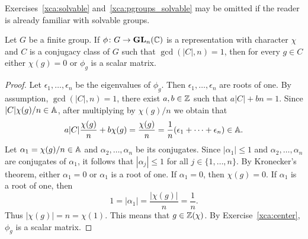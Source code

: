 Exercises~\ref{xca:solvable} and~\ref{xca:pgroups_solvable} may be omitted if the reader is already familiar with solvable groups.

\begin{theorem}[Burnside]
	\label{thm:Burnside_auxiliar}
	Let $G$ be a finite group. If $\phi\colon G\to\mathbf{GL}_n(\mathbb{C})$ is a representation
	with character $\chi$ and $C$ is a conjugacy class of $G$ such that 
	$\gcd(|C|,n)=1$, then for every $g\in C$ either 
	$\chi(g)=0$ or $\phi_g$ is a scalar matrix. 
\end{theorem}





 \begin{proof}
	Let $\epsilon_1,\dots,\epsilon_n$ be the eigenvalues of $\phi_g$. Then 
    $\epsilon_1,\dots,\epsilon_n$ are roots of one. 
    By assumption, 
	$\gcd(|C|,n)=1$, there exist $a,b\in\mathbb{Z}$ such that $a|C|+bn=1$. Since 
	$|C|\chi(g)/n\in\mathbb{A}$, after multiplying by $\chi(g)/n$ we obtain that  
	\[
		a|C|\frac{\chi(g)}{n}+b\chi(g)=\frac{\chi(g)}{n}=\frac{1}{n}(\epsilon_1+\cdots+\epsilon_n)\in\mathbb{A}.
	\]
    Let $\alpha_1=\chi(g)/n\in\mathbb{A}$ and $\alpha_2,\dots,\alpha_n$ be its conjugates. Since $|\alpha_1|\leq 1$ 
    and $\alpha_2,\dots,\alpha_n$ are conjugates of $\alpha_1$, it follows that  
    $|\alpha_j|\leq 1$ for all $j\in\{1,\dots,n\}$. By Kronecker's theorem, 
    either $\alpha_1=0$ or $\alpha_1$ is a root of one. If $\alpha_1=0$, then $\chi(g)=0$. If 
    $\alpha_1$ is a root of one, then 
    \[
    1=|\alpha_1|=\frac{|\chi(g)|}{n}=\frac1{n}.
    \]
    Thus $|\chi(g)|=n=\chi(1)$. This means that $g\in\mathbb{Z}(\chi)$. By Exercise~\ref{xca:center}, 
    $\phi_g$ is a scalar matrix. 
\end{proof}

